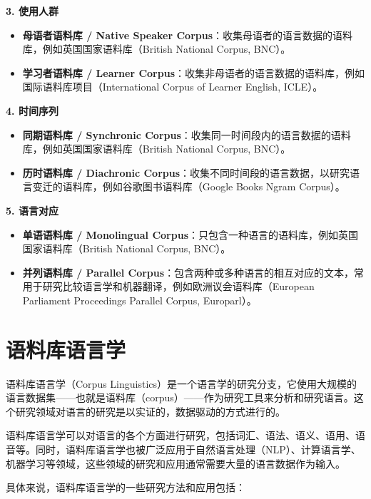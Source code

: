 \documentclass[]{book}
\begin{document}
\textbf{3. 使用人群}

\begin{itemize}
\item
  \textbf{母语者语料库 / Native Speaker Corpus}：收集母语者的语言数据的语料库，例如英国国家语料库（British National Corpus, BNC）。
\item
  \textbf{学习者语料库 / Learner Corpus}：收集非母语者的语言数据的语料库，例如国际语料库项目（International Corpus of Learner English, ICLE）。
\end{itemize}

\textbf{4. 时间序列}

\begin{itemize}
\item
  \textbf{同期语料库 / Synchronic Corpus}：收集同一时间段内的语言数据的语料库，例如英国国家语料库（British National Corpus, BNC）。
\item
  \textbf{历时语料库 / Diachronic Corpus}：收集不同时间段的语言数据，以研究语言变迁的语料库，例如谷歌图书语料库（Google Books Ngram Corpus）。
\end{itemize}

\textbf{5. 语言对应}

\begin{itemize}
\item
  \textbf{单语语料库 / Monolingual Corpus}：只包含一种语言的语料库，例如英国国家语料库（British National Corpus, BNC）。
\item
  \textbf{并列语料库 / Parallel Corpus}：包含两种或多种语言的相互对应的文本，常用于研究比较语言学和机器翻译，例如欧洲议会语料库（European Parliament Proceedings Parallel Corpus, Europarl）。
\end{itemize}

\hypertarget{ux8bedux6599ux5e93ux8bedux8a00ux5b66}{%
\section{语料库语言学}\label{ux8bedux6599ux5e93ux8bedux8a00ux5b66}}

语料库语言学（Corpus Linguistics）是一个语言学的研究分支，它使用大规模的语言数据集------也就是语料库（corpus）------作为研究工具来分析和研究语言。这个研究领域对语言的研究是以实证的，数据驱动的方式进行的。

语料库语言学可以对语言的各个方面进行研究，包括词汇、语法、语义、语用、语音等。同时，语料库语言学也被广泛应用于自然语言处理（NLP）、计算语言学、机器学习等领域，这些领域的研究和应用通常需要大量的语言数据作为输入。

具体来说，语料库语言学的一些研究方法和应用包括：
\end{document}
